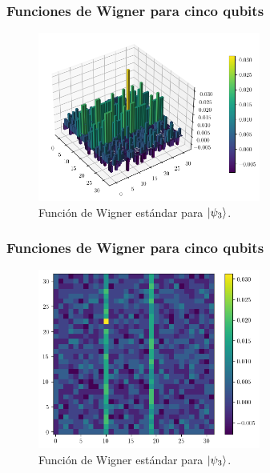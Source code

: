 \documentclass[10pt, spanish]{beamer}
\begin{document}
  \begin{frame}
    \frametitle{Funciones de Wigner para cinco qubits}

    \begin{figure}[h]
      \centering
      \includegraphics[width=0.65\textwidth]{
      imgs/wigner-standard-2-5-s3.png}
      \caption{Función de Wigner estándar para
      $\ket{\psi_3}$.}
      \label{fig:wigner-standard-2-5-s3}
    \end{figure}
  \end{frame}

  \begin{frame}
    \frametitle{Funciones de Wigner para cinco qubits}

    \begin{figure}[h]
      \centering
      \includegraphics[width=0.65\textwidth]{
      imgs/wigner-standard-2-5-s3-heat.png}
      \caption{Función de Wigner estándar para
      $\ket{\psi_3}$.}
      \label{fig:wigner-standard-2-5-s3-heat}
    \end{figure}
  \end{frame}
\end{document}
